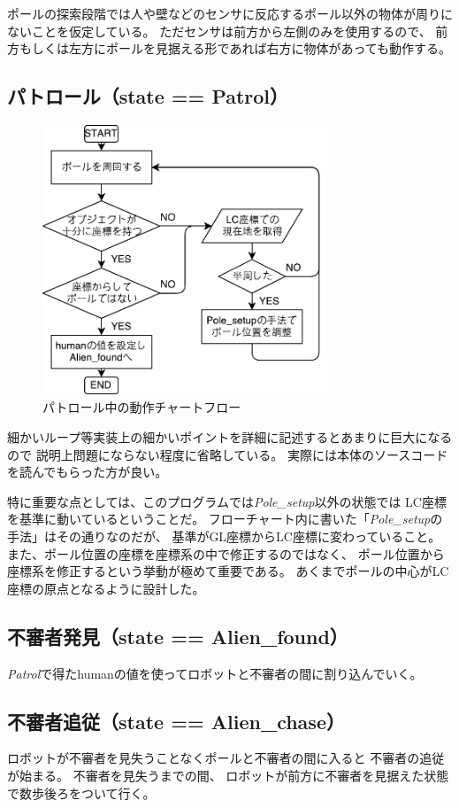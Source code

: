 \documentclass[main]{subfiles}
\begin{document}
ポールの探索段階では人や壁などのセンサに反応するポール以外の物体が周りにないことを仮定している。
ただセンサは前方から左側のみを使用するので、
前方もしくは左方にポールを見据える形であれば右方に物体があっても動作する。

\subsection{パトロール（state == Patrol）}

\begin{figure}[H]
	\centering
	\includegraphics[width=8.5cm]{img/guard_patrol.pdf}
	\caption{パトロール中の動作チャートフロー}
\end{figure}

細かいループ等実装上の細かいポイントを詳細に記述するとあまりに巨大になるので
説明上問題にならない程度に省略している。
実際には本体のソースコードを読んでもらった方が良い。

特に重要な点としては、このプログラムでは\textit{Pole\_setup}以外の状態では
LC座標を基準に動いているということだ。
フローチャート内に書いた「\textit{Pole\_setup}の手法」はその通りなのだが、
基準がGL座標からLC座標に変わっていること。
また、ポール位置の座標を座標系の中で修正するのではなく、
ポール位置から座標系を修正するという挙動が極めて重要である。
あくまでポールの中心がLC座標の原点となるように設計した。

\subsection{不審者発見（state == Alien\_found）}
\textit{Patrol}で得たhumanの値を使ってロボットと不審者の間に割り込んでいく。


\subsection{不審者追従（state == Alien\_chase）}
ロボットが不審者を見失うことなくポールと不審者の間に入ると
不審者の追従が始まる。
不審者を見失うまでの間、
ロボットが前方に不審者を見据えた状態で数歩後ろをついて行く。
\end{document}
